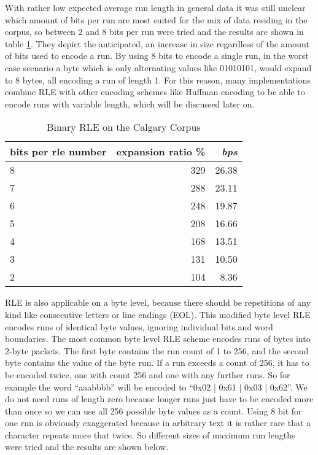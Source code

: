 \par{
	With rather low expected average run length in general data it was still unclear which amount of bits per run are most suited for the mix of data residing in the corpus, so between 2 and 8 bits per run were tried and the results are shown in table \ref{tab:t4 simple run length eval}. They depict the anticipated, an increase in size regardless of the amount of bits used to encode a run. By using 8 bits to encode a single run, in the worst case scenario a byte which is only alternating values like 01010101, would expand to 8 bytes, all encoding a run of length 1. For this reason, many implementations combine RLE with other encoding schemes like Huffman encoding to be able to encode runs with variable length, which will be discussed later on.
}

\begin{table}[h]
	\centering
	\begin{tabular}{l|r|r}
		\label{tab:t4 simple run length eval}
		
		bits per rle number &  expansion ratio \% & \textit{bps}\\
		\hline
		8 & 329 & 26.38\\
		7 & 288 & 23.11\\
		6 & 248 & 19.87\\
		5 & 208 & 16.66\\
		4 & 168 & 13.51\\
		3 & 131 & 10.50\\
		2 & 104 & 8.36\\
	\end{tabular}
	\caption{Binary RLE on the Calgary Corpus}
\end{table}

\par{
RLE is also applicable on a byte level, because there should be repetitions of any kind like consecutive letters or line endings (EOL). This modified byte level RLE encodes runs of identical byte values, ignoring individual bits and word boundaries. The most common byte level RLE scheme encodes runs of bytes into 2-byte packets. The first byte contains the run count of 1 to 256, and the second byte contains the value of the byte run. If a run exceeds a count of 256, it has to be encoded twice, one with count 256 and one with any further runs. So for example the word \enquote{aaabbbb} will be encoded to \enquote{0x02 | 0x61 | 0x03 | 0x62}. We do not need runs of length zero because longer runs just have to be encoded more than once so we can use all 256 possible byte values as a count. Using 8 bit for one run is obviously exaggerated because in arbitrary text it is rather rare that a character repeats more that twice. So different sizes of maximum run lengths were tried and the results are shown below.
}


